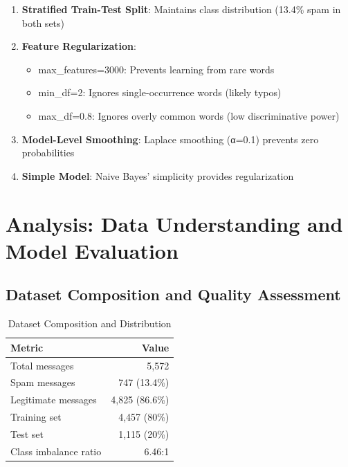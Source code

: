 \documentclass[12pt,a4paper]{article}
\begin{document}
\begin{enumerate}
    \item \textbf{Stratified Train-Test Split}: Maintains class distribution (13.4\% spam in both sets)
    \item \textbf{Feature Regularization}:
    \begin{itemize}
        \item max\_features=3000: Prevents learning from rare words
        \item min\_df=2: Ignores single-occurrence words (likely typos)
        \item max\_df=0.8: Ignores overly common words (low discriminative power)
    \end{itemize}
    \item \textbf{Model-Level Smoothing}: Laplace smoothing (α=0.1) prevents zero probabilities
    \item \textbf{Simple Model}: Naive Bayes' simplicity provides regularization
\end{enumerate}


\section{Analysis: Data Understanding and Model Evaluation}

\subsection{Dataset Composition and Quality Assessment}

\begin{table}[H]
\centering
\begin{tabular}{lr}
\toprule
\textbf{Metric} & \textbf{Value} \\
\midrule
Total messages & 5,572 \\
Spam messages & 747 (13.4\%) \\
Legitimate messages & 4,825 (86.6\%) \\
Training set & 4,457 (80\%) \\
Test set & 1,115 (20\%) \\
Class imbalance ratio & 6.46:1 \\
\bottomrule
\end{tabular}
\caption{Dataset Composition and Distribution}
\end{table}
\end{document}

